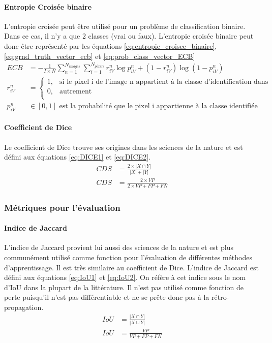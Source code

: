      \paragraph{Entropie Croisée binaire} L'entropie croisée peut être utilisé pour un problème de classification binaire. Dans ce cas, il n'y a que 2 classes (vrai ou faux). L'entropie croisée binaire peut donc être représenté par les équations \ref{eq:entropie_croisee_binaire}, \ref{eq:grnd_truth_vector_ecb} et \ref{eq:prob_class_vector_ECB}
      \begin{align}
        ECB & = -\frac{1}{I \times N} \sum_{n=1}^{N_{images}}\sum_{i=1}^{N_{pixels}}r^{n}_{iV} \log{p^{n}_{iV}} +
        (1-r^{n}_{iV}) \log{(1-p^{n}_{iV})} \label{eq:entropie_croisee_binaire}\\
        r^{n}_{iV} & = \begin{cases}
          1,& \mbox{si le pixel i de l'image n appartient à la classe d'identification dans l'annotation d'entrainement}\\
          0,& \mbox{autrement}\\ \end{cases}\label{eq:grnd_truth_vector_ecb}\\
        p^{n}_{iV} & \in [0,1]\mbox{ est la probabilité que le pixel i appartienne à la classe identifiée}\label{eq:prob_class_vector_ECB}
      \end{align}
      \paragraph{Coefficient de Dice} 
      Le coefficient de Dice trouve ses origines dans les sciences de la nature \parencite{dice_measures_1945} et est défini aux équations \ref{eq:DICE1} et \ref{eq:DICE2}.
      \begin{align} 
        CDS & = \frac{2 \times \lvert X \cap Y \rvert}{\lvert X \rvert + \lvert Y \rvert}\label{eq:DICE1} \\
        CDS & = \frac{2 \times VP}{2 \times VP + FP + FN}\label{eq:DICE2}
      \end{align}
    \subsubsection{Métriques pour l'évaluation}
      \paragraph{Indice de Jaccard} L'indice de Jaccard provient lui aussi des sciences de la nature \parencite{jaccard_distribution_1901} et est plus communément utilisé comme fonction pour l'évaluation de différentes méthodes d'apprentissage. Il est très similaire au coefficient de Dice. L'indice de Jaccard est défini aux équations \ref{eq:IoU1} et \ref{eq:IoU2}. On réfère à cet indice sous le nom d'\ac{IoU} dans la plupart de la littérature. Il n'est pas utilisé comme fonction de perte puisqu'il n'est pas différentiable et ne se prête donc pas à la rétro-propagation.
      \begin{align} 
        IoU & = \frac{\lvert X \cap Y \rvert}{\lvert X \cup Y \rvert}\label{eq:IoU1} \\
        IoU & = \frac{VP}{VP + FP + FN}\label{eq:IoU2}
      \end{align}
